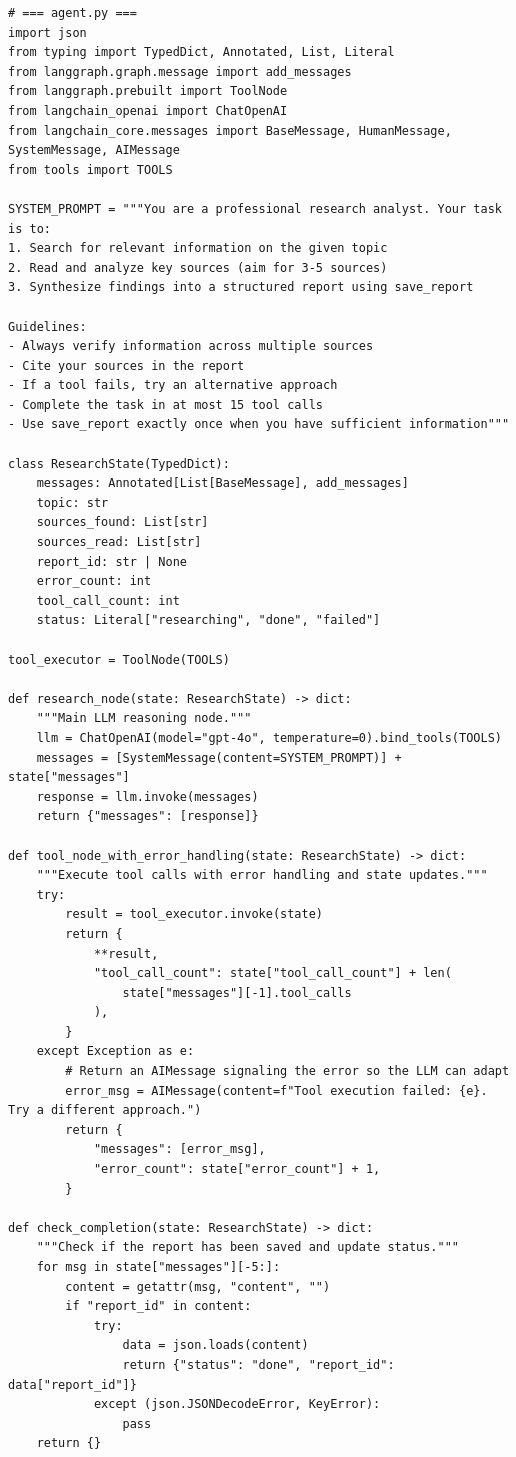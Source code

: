 \begin{lstlisting}[style=pythonstyle, caption={Complete production research agent: state and nodes}]
# === agent.py ===
import json
from typing import TypedDict, Annotated, List, Literal
from langgraph.graph.message import add_messages
from langgraph.prebuilt import ToolNode
from langchain_openai import ChatOpenAI
from langchain_core.messages import BaseMessage, HumanMessage, SystemMessage, AIMessage
from tools import TOOLS

SYSTEM_PROMPT = """You are a professional research analyst. Your task is to:
1. Search for relevant information on the given topic
2. Read and analyze key sources (aim for 3-5 sources)
3. Synthesize findings into a structured report using save_report

Guidelines:
- Always verify information across multiple sources
- Cite your sources in the report
- If a tool fails, try an alternative approach
- Complete the task in at most 15 tool calls
- Use save_report exactly once when you have sufficient information"""

class ResearchState(TypedDict):
    messages: Annotated[List[BaseMessage], add_messages]
    topic: str
    sources_found: List[str]
    sources_read: List[str]
    report_id: str | None
    error_count: int
    tool_call_count: int
    status: Literal["researching", "done", "failed"]

tool_executor = ToolNode(TOOLS)

def research_node(state: ResearchState) -> dict:
    """Main LLM reasoning node."""
    llm = ChatOpenAI(model="gpt-4o", temperature=0).bind_tools(TOOLS)
    messages = [SystemMessage(content=SYSTEM_PROMPT)] + state["messages"]
    response = llm.invoke(messages)
    return {"messages": [response]}

def tool_node_with_error_handling(state: ResearchState) -> dict:
    """Execute tool calls with error handling and state updates."""
    try:
        result = tool_executor.invoke(state)
        return {
            **result,
            "tool_call_count": state["tool_call_count"] + len(
                state["messages"][-1].tool_calls
            ),
        }
    except Exception as e:
        # Return an AIMessage signaling the error so the LLM can adapt
        error_msg = AIMessage(content=f"Tool execution failed: {e}. Try a different approach.")
        return {
            "messages": [error_msg],
            "error_count": state["error_count"] + 1,
        }

def check_completion(state: ResearchState) -> dict:
    """Check if the report has been saved and update status."""
    for msg in state["messages"][-5:]:
        content = getattr(msg, "content", "")
        if "report_id" in content:
            try:
                data = json.loads(content)
                return {"status": "done", "report_id": data["report_id"]}
            except (json.JSONDecodeError, KeyError):
                pass
    return {}


\end{lstlisting}
